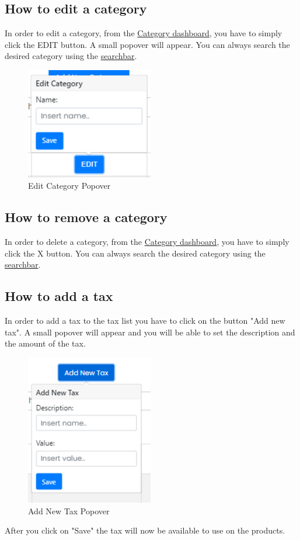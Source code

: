 \subsection{How to edit a category}\label{_editCategory}
In order to edit a category, from the \hyperref[_categorymanagement]{Category dashboard}, you have to simply click the EDIT button.
A small popover will appear.
You can always search the desired category using the \hyperref[_findCategory]{searchbar}.
\begin{figure}[H]   
    \centering
    \includegraphics[width=15em]{res/images/venditore/editcategory.png}
    \caption{Edit Category Popover}
\end{figure}

\subsection{How to remove a category}\label{_removeCategory}
In order to delete a category, from the \hyperref[_categorymanagement]{Category dashboard}, you have to simply click the X button.
You can always search the desired category using the \hyperref[_findCategory]{searchbar}.

\subsection{How to add a tax}\label{_addTax}
In order to add a tax to the tax list you have to click on the button "Add new tax". A small popover will appear and you will be able to set the description and the amount of the tax.
\begin{figure}[H]
    \centering
    \includegraphics[width=15em]{res/images/venditore/addtax.png}
    \caption{Add New Tax Popover}
\end{figure}
After you click on "Save" the tax will now be available to use on the products.

